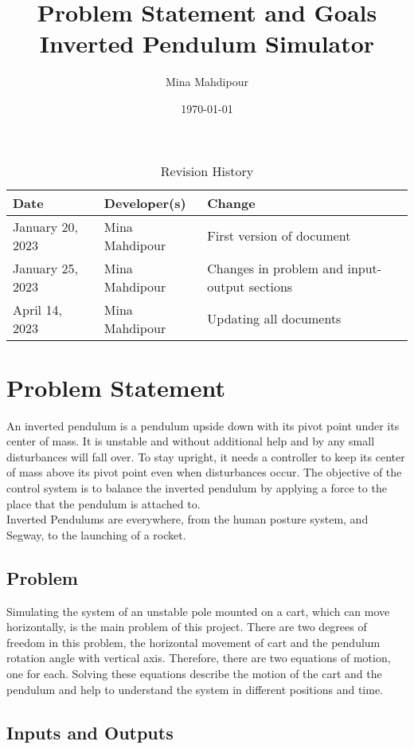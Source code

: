 \documentclass{article}
\title{Problem Statement and Goals\\Inverted Pendulum Simulator}
\author{Mina Mahdipour}
\date{\today}
\begin{document}
\maketitle

\begin{table}[hp]
\caption{Revision History} \label{TblRevisionHistory}
\begin{tabularx}{\textwidth}{llX}
\toprule
\textbf{Date} & \textbf{Developer(s)} & \textbf{Change}\\
\midrule
January 20, 2023 & Mina Mahdipour & First version of document\\
January 25, 2023 & Mina Mahdipour & Changes in problem and input-output sections\\
April 14, 2023 & Mina Mahdipour & Updating all documents\\
\bottomrule
\end{tabularx}
\end{table}

\section{Problem Statement}

An inverted pendulum is a pendulum upside down with its pivot point under its center of mass. It is unstable and without additional help and by any small disturbances will fall over. To stay upright, it needs a controller to keep its center of mass above its pivot point even when disturbances occur. The objective of the control system is to balance the inverted pendulum by applying a force to the place that the pendulum is attached to.\\
Inverted Pendulums are everywhere, from the human posture system, and Segway, to the launching of a rocket.

\subsection{Problem}

Simulating the system of an unstable pole mounted on a cart, which can move horizontally, is the main problem of this project. There are two degrees of freedom in this problem, the horizontal movement of cart and the pendulum rotation angle with vertical axis. Therefore, there are two equations of motion, one for each. Solving these equations describe the motion of the cart and the pendulum and help to understand the system in different positions and time.

\subsection{Inputs and Outputs}
\end{document}
